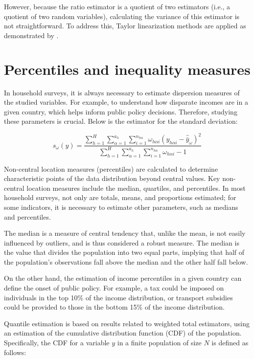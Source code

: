 \documentclass[
  12pt,
]{book}
\begin{document}
However, because the ratio estimator is a quotient of two estimators (i.e., a quotient of two random variables), calculating the variance of this estimator is not straightforward. To address this, Taylor linearization methods are applied as demonstrated by \citet{Gutierrez_2016}.

\hypertarget{percentiles-and-inequality-measures}{%
\section{Percentiles and inequality measures}\label{percentiles-and-inequality-measures}}

In household surveys, it is always necessary to estimate dispersion measures of the studied variables. For example, to understand how disparate incomes are in a given country, which helps inform public policy decisions. Therefore, studying these parameters is crucial. Below is the estimator for the standard deviation:

\[
s_{\omega}\left(y\right) = \frac{\sum_{h=1}^{H}\sum_{\alpha=1}^{a_{h}}\sum_{i=1}^{n_{h\alpha}}\omega_{h\alpha i}\left(y_{h\alpha i}-\hat{\bar{y}}_{\omega}\right)^{2}}{\sum_{h=1}^{H}\sum_{\alpha=1}^{a_{h}}\sum_{i=1}^{n_{h\alpha}}\omega_{h\alpha i}-1}
\]

Non-central location measures (percentiles) are calculated to determine characteristic points of the data distribution beyond central values. Key non-central location measures include the median, quartiles, and percentiles. In most household surveys, not only are totals, means, and proportions estimated; for some indicators, it is necessary to estimate other parameters, such as medians and percentiles.

The median is a measure of central tendency that, unlike the mean, is not easily influenced by outliers, and is thus considered a robust measure. The median is the value that divides the population into two equal parts, implying that half of the population's observations fall above the median and the other half fall below.

On the other hand, the estimation of income percentiles in a given country can define the onset of public policy. For example, a tax could be imposed on individuals in the top 10\% of the income distribution, or transport subsidies could be provided to those in the bottom 15\% of the income distribution.

Quantile estimation is based on results related to weighted total estimators, using an estimation of the cumulative distribution function (CDF) of the population. Specifically, the CDF for a variable \(y\) in a finite population of size \(N\) is defined as follows:
\end{document}
